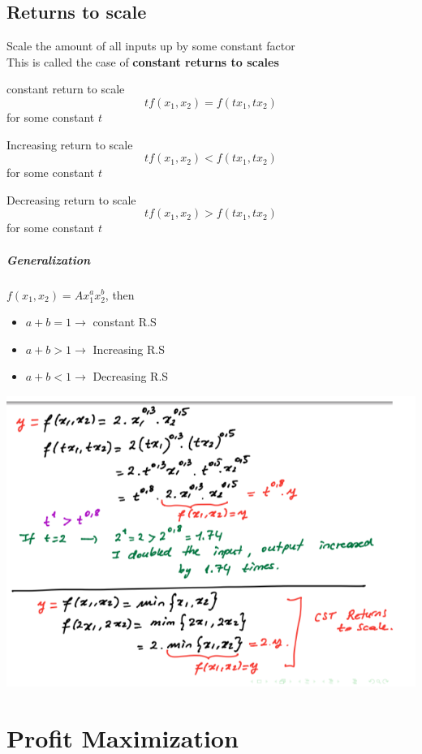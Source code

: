 \documentclass{report}
\begin{document}
\section{Returns to scale}
Scale the amount of all inputs up by some constant factor\\This is called the case of \textbf{constant returns to scales}
\begin{defbox}
constant return to scale
$$tf(x_1,x_2) = f(tx_1,tx_2)$$
for some constant $t$
\end{defbox}
\begin{defbox}
Increasing return to scale
$$tf(x_1,x_2) < f(tx_1,tx_2)$$
for some constant $t$
\end{defbox}
\begin{defbox}
Decreasing return to scale
$$tf(x_1,x_2) > f(tx_1,tx_2)$$
for some constant $t$
\end{defbox}
\paragraph{Generalization}
$f(x_1,x_2) = Ax_1^ax_2^b$, then
\begin{itemize}
\item $a + b = 1\to$ constant R.S
\item $a+b>1\to$ Increasing R.S
\item $a+b<1\to$ Decreasing R.S
\end{itemize}
\includegraphics[width = \textwidth]{econ8}
\chapter{Profit Maximization}
\end{document}
